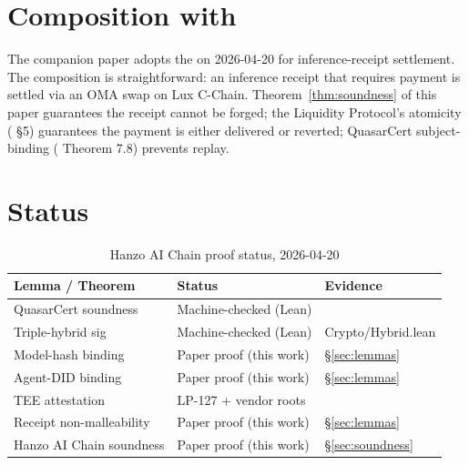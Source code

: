 \documentclass[11pt]{article}
\begin{document}
\section{Composition with }
\label{sec:lp-compose}

The companion paper \cite{hanzo-adopts} adopts the 
on 2026-04-20 for inference-receipt settlement. The composition is
straightforward: an inference receipt that requires payment is
settled via an OMA swap on Lux C-Chain. Theorem~\ref{thm:soundness}
of this paper guarantees the receipt cannot be forged; the Liquidity
Protocol's atomicity (\cite{lp-paper} \S5) guarantees the payment is
either delivered or reverted; QuasarCert subject-binding
(\cite{quasar-cert} Theorem 7.8) prevents replay.

\section{Status}
\label{sec:status}

\begin{table}[h]
\centering
\caption{Hanzo AI Chain proof status, 2026-04-20}
\begin{tabular}{lll}
\toprule
Lemma / Theorem & Status & Evidence \\
\midrule
QuasarCert soundness         & Machine-checked (Lean) & \cite{quasar-cert} \\
Triple-hybrid sig            & Machine-checked (Lean) & Crypto/Hybrid.lean \\
Model-hash binding           & Paper proof (this work) & \S\ref{sec:lemmas} \\
Agent-DID binding            & Paper proof (this work) & \S\ref{sec:lemmas} \\
TEE attestation              & LP-127 + vendor roots   & \cite{lp127} \\
Receipt non-malleability     & Paper proof (this work) & \S\ref{sec:lemmas} \\
Hanzo AI Chain soundness     & Paper proof (this work) & \S\ref{sec:soundness} \\
\bottomrule
\end{tabular}
\end{table}
\end{document}
